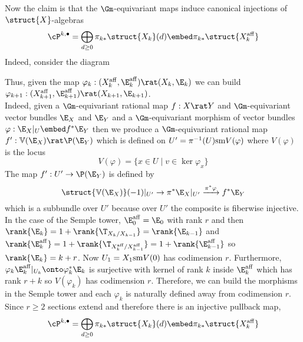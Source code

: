 \documentclass[12pt]{article}
\newcommand{\V}{\mathbb{V}}
\begin{document}
Now the claim is that the $\Gm$-equivariant maps induce canonical injections of $\struct{X}$-algebras
\[ \cP^{k, \bullet} = \bigoplus_{d \ge 0} \pi_{k*} \struct{X_k}(d)\embed \pi_{k*} \struct{X_k^{\aff}}  \]
Indeed, consider the diagram
\begin{center}
\end{center}
Thus, given the map $\varphi_k : (X_k^\aff, \E_k^\aff) \rat (X_k, \E_k)$ we can build $\varphi_{k+1} : (X_{k+1}^\aff, \E_{k+1}^\aff) \rat (X_{k+1}, \E_{k+1})$. 
\bigskip\\
Indeed, given a $\Gm$-equivariant rational map $f : X \rat Y$ and $\Gm$-equivariant vector bundles $\E_X$ and $\E_Y$ and a $\Gm$-equivariant morphism of vector bundles $\varphi : \E_X|_U \embed f^* \E_Y$ then we produce a $\Gm$-equivariant rational map $f' : \V(\E_X) \rat \P(\E_Y)$ which is defined on $U' = \pi^{-1}(U) \mathrm{sm} V(\varphi)$ where $V(\varphi)$ is the locus
\[ V(\varphi) = \{ x \in U \mid v \in \ker{\varphi_x} \} \] 
The map $f' : U' \to \P(\E_Y)$ is defined by 
\[ \struct{\V(\E_X)}(-1)|_{U'} \to \pi^* \E_X|_{U'} \xrightarrow{\pi^* \varphi} f^* \E_Y \]
which is a subbundle over $U'$ because over $U'$ the composite is fiberwise injective.
\bigskip\\
In the case of the Semple tower, $\E_0^{\aff} = \E_0$ with rank $r$ and then $\rank{\E_k} = 1 + \rank{\T_{X_k/X_{k-1}}} = \rank{\E_{k-1}}$ and $\rank{\E_k^{\aff}} = 1 + \rank{\T_{X_k^\aff / X_{k-1}^\aff}} = 1 + \rank{\E_{k-1}^{\aff}}$ so $\rank{\E_k} = k + r$. Now $U_1 = X_1 \mathrm{sm} V(0)$ has codimension $r$. Furthermore, $\varphi_k \E_k^{\aff}|_{U_k} \onto \varphi^*_k \E_k$ is surjective with kernel of rank $k$ inside $\E_k^{\aff}$ which has rank $r + k$ so $V(\varphi_k)$ has codimension $r$. Therefore, we can build the morphisms in the Semple tower and each $\varphi_k$ is naturally defined away from codimension $r$. Since $r \ge 2$ sections extend and therefore there is an injective pullback map,
\[ \cP^{k, \bullet} = \bigoplus_{d \ge 0} \pi_{k*} \struct{X_k}(d)\embed \pi_{k*} \struct{X_k^{\aff}}  \]
\end{document}
